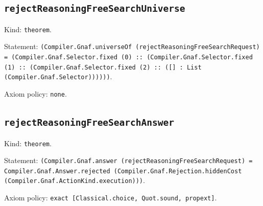 \documentclass[11pt]{article}
\begin{document}
\subsection*{\texttt{rejectReasoningFreeSearchUniverse}}
\noindent Kind: \texttt{theorem}.\par
\noindent Statement: \texttt{(Compiler.Gnaf.universeOf (rejectReasoningFreeSearchRequest) = (Compiler.Gnaf.Selector.fixed (0) :: (Compiler.Gnaf.Selector.fixed (1) :: (Compiler.Gnaf.Selector.fixed (2) :: ([] : List (Compiler.Gnaf.Selector))))))}.\par
\noindent Axiom policy: \texttt{none}.\par
\subsection*{\texttt{rejectReasoningFreeSearchAnswer}}
\noindent Kind: \texttt{theorem}.\par
\noindent Statement: \texttt{(Compiler.Gnaf.answer (rejectReasoningFreeSearchRequest) = Compiler.Gnaf.Answer.rejected (Compiler.Gnaf.Rejection.hiddenCost (Compiler.Gnaf.ActionKind.execution)))}.\par
\noindent Axiom policy: \texttt{exact [Classical.choice, Quot.sound, propext]}.\par
\end{document}
